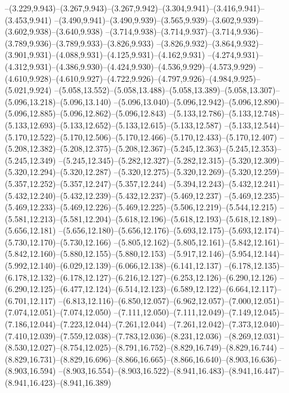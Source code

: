   --(3.229,9.943)--(3.267,9.943)--(3.267,9.942)--(3.304,9.941)--(3.416,9.941)--(3.453,9.941)%
  --(3.490,9.941)--(3.490,9.939)--(3.565,9.939)--(3.602,9.939)--(3.602,9.938)--(3.640,9.938)%
  --(3.714,9.938)--(3.714,9.937)--(3.714,9.936)--(3.789,9.936)--(3.789,9.933)--(3.826,9.933)%
  --(3.826,9.932)--(3.864,9.932)--(3.901,9.931)--(4.088,9.931)--(4.125,9.931)--(4.162,9.931)%
  --(4.274,9.931)--(4.312,9.931)--(4.386,9.930)--(4.424,9.930)--(4.536,9.929)--(4.573,9.929)%
  --(4.610,9.928)--(4.610,9.927)--(4.722,9.926)--(4.797,9.926)--(4.984,9.925)--(5.021,9.924)%
  --(5.058,13.552)--(5.058,13.488)--(5.058,13.389)--(5.058,13.307)--(5.096,13.218)--(5.096,13.140)%
  --(5.096,13.040)--(5.096,12.942)--(5.096,12.890)--(5.096,12.885)--(5.096,12.862)--(5.096,12.843)%
  --(5.133,12.786)--(5.133,12.748)--(5.133,12.693)--(5.133,12.652)--(5.133,12.615)--(5.133,12.587)%
  --(5.133,12.544)--(5.170,12.522)--(5.170,12.506)--(5.170,12.466)--(5.170,12.433)--(5.170,12.407)%
  --(5.208,12.382)--(5.208,12.375)--(5.208,12.367)--(5.245,12.363)--(5.245,12.353)--(5.245,12.349)%
  --(5.245,12.345)--(5.282,12.327)--(5.282,12.315)--(5.320,12.309)--(5.320,12.294)--(5.320,12.287)%
  --(5.320,12.275)--(5.320,12.269)--(5.320,12.259)--(5.357,12.252)--(5.357,12.247)--(5.357,12.244)%
  --(5.394,12.243)--(5.432,12.241)--(5.432,12.240)--(5.432,12.239)--(5.432,12.237)--(5.469,12.237)%
  --(5.469,12.235)--(5.469,12.233)--(5.469,12.226)--(5.469,12.225)--(5.506,12.219)--(5.544,12.215)%
  --(5.581,12.213)--(5.581,12.204)--(5.618,12.196)--(5.618,12.193)--(5.618,12.189)--(5.656,12.181)%
  --(5.656,12.180)--(5.656,12.176)--(5.693,12.175)--(5.693,12.174)--(5.730,12.170)--(5.730,12.166)%
  --(5.805,12.162)--(5.805,12.161)--(5.842,12.161)--(5.842,12.160)--(5.880,12.155)--(5.880,12.153)%
  --(5.917,12.146)--(5.954,12.144)--(5.992,12.140)--(6.029,12.139)--(6.066,12.138)--(6.141,12.137)%
  --(6.178,12.135)--(6.178,12.132)--(6.178,12.127)--(6.216,12.127)--(6.253,12.126)--(6.290,12.126)%
  --(6.290,12.125)--(6.477,12.124)--(6.514,12.123)--(6.589,12.122)--(6.664,12.117)--(6.701,12.117)%
  --(6.813,12.116)--(6.850,12.057)--(6.962,12.057)--(7.000,12.051)--(7.074,12.051)--(7.074,12.050)%
  --(7.111,12.050)--(7.111,12.049)--(7.149,12.045)--(7.186,12.044)--(7.223,12.044)--(7.261,12.044)%
  --(7.261,12.042)--(7.373,12.040)--(7.410,12.039)--(7.559,12.038)--(7.783,12.036)--(8.231,12.036)%
  --(8.269,12.031)--(8.530,12.027)--(8.754,12.025)--(8.791,16.752)--(8.829,16.749)--(8.829,16.744)%
  --(8.829,16.731)--(8.829,16.696)--(8.866,16.665)--(8.866,16.640)--(8.903,16.636)--(8.903,16.594)%
  --(8.903,16.554)--(8.903,16.522)--(8.941,16.483)--(8.941,16.447)--(8.941,16.423)--(8.941,16.389)%
